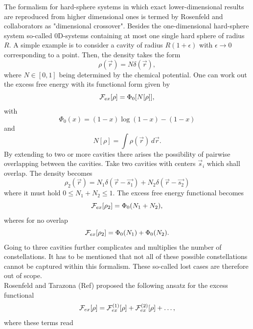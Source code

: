 \documentclass{article}
\begin{document}
The formalism for hard-sphere systems in which exact lower-dimensional results are reproduced from higher dimensional ones is termed by Rosenfeld and collaborators as "dimensional crossover". Besides the one-dimensional hard-sphere system so-called 0D-systems containing at most one single hard sphere of radius $R$. A simple example is to consider a cavity of radius $R(1+\epsilon)$ with $\epsilon\rightarrow 0$ corresponding to a point. Then, the density takes the form
\begin{equation}
	\rho(\vec{r}) = N\delta(\vec{r}),
\end{equation}
where $N\in[0,1]$ being determined by the chemical potential. One can work out the excess free energy with its functional form given by
\begin{equation}
	{\cal F}_{ex}[\rho] = \Phi_0[N[\rho]],
\end{equation}
with
\begin{equation}
	\Phi_0(x) = (1-x)\log(1-x)-(1-x)
\end{equation}
and
\begin{equation}
	N[\rho] = \int\rho(\vec{r})\,d\vec{r}.
\end{equation}
By extending to two or more cavities there arises the possibility of pairwise overlapping between the cavities. Take two cavities with centers $\vec{s}_i$ which shall overlap. The density becomes
\begin{equation}
	\rho_2(\vec{r}) = N_1\delta(\vec{r}-\vec{s_1})+N_2\delta(\vec{r}-\vec{s_2})
\end{equation}
where it must hold $0\leq N_1+N_2\leq 1$. The excess free energy functional becomes
\begin{equation}
	{\cal F}_{ex}[\rho_2] = \Phi_0(N_1+N_2),
\end{equation}
wheres for no overlap
\begin{equation}
	{\cal F}_{ex}[\rho_2] = \Phi_0(N_1)+\Phi_0(N_2).
\end{equation}
Going to three cavities further complicates and multiplies the number of constellations. It has to be mentioned that not all of these possible constellations cannot be captured within this formalism. These so-called lost cases are therefore out of scope.\\
Rosenfeld and Tarazona (Ref) proposed the following ansatz for the excess functional
\begin{equation}
	{\cal F}_{ex}[\rho] = {\cal F}^{(1)}_{ex}[\rho]+{\cal F}^{(2)}_{ex}[\rho]+\dots, 
\end{equation}
where these terms read
\end{document}
